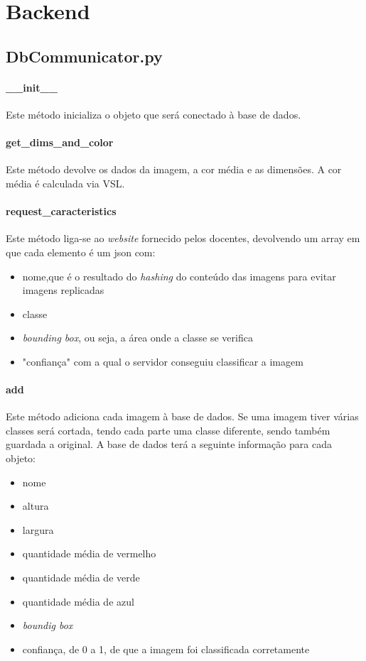 \documentclass{report}
\begin{document}
\section{Backend}
\subsection{DbCommunicator.py}
\paragraph{\_\_init\_\_}
Este método inicializa o objeto que será conectado à base de dados.

\paragraph{get\_dims\_and\_color}
Este método devolve os dados da imagem, a cor média e as dimensões. A cor média é calculada via VSL.

\paragraph{request\_caracteristics}
Este método liga-se ao \textit{website} fornecido pelos docentes, devolvendo um array em que cada elemento é um json com:
\begin{itemize}
\item nome,que é o resultado do \textit{hashing} do conteúdo das imagens para evitar imagens replicadas
\item classe
\item \textit{bounding box}, ou seja, a área onde a classe se verifica
\item "confiança" com a qual o servidor conseguiu classificar a imagem
\end{itemize}

\paragraph{add}
Este método adiciona cada imagem à base de dados. Se uma imagem tiver várias classes será  cortada, tendo cada parte  uma classe diferente, sendo também guardada a original. A base de dados terá a seguinte informação para cada objeto:
\begin{itemize}
\item nome
\item altura
\item largura
\item quantidade média de vermelho
\item quantidade média de verde
\item quantidade média de azul
\item \textit{boundig box}
\item confiança, de 0 a 1, de que a imagem foi classificada corretamente
\end{itemize}
\end{document}
